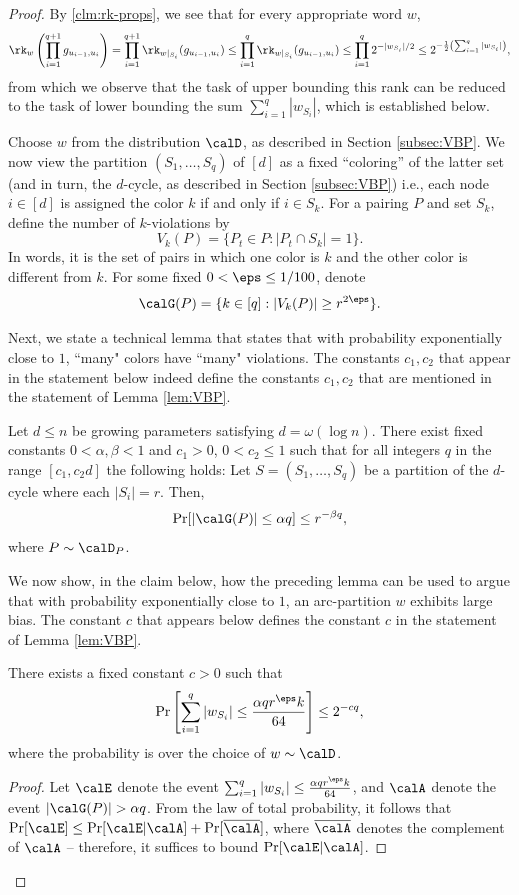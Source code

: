 \documentclass{article}
\begin{document}
\begin{proof}
By \autoref{clm:rk-props}, we see that for every appropriate word $w$,
\[
\rk_w\left(\prod_{i = 1}^{q+1} g_{u_{i-1},u_i}\right) = \prod_{i = 1}^{q+1} \rk_{w|_{S_i}}(g_{u_{i-1},u_i})
\leq \prod_{i = 1}^{q} \rk_{w|_{S_i}}(g_{u_{i-1},u_i})\leq\prod_{i = 1}^q  2^{-|w_{S_i}|/2}\leq 2^{-\frac12\left(\sum_{i=1}^q |w_{S_i}|\right)},
\]
from which we observe that the task of upper bounding this rank can be reduced to the task of lower bounding the sum $\sum_{i=1}^{q}|w_{S_i}|$, which is established below. 

Choose $w$ from the distribution $\calD$, as described in Section \ref{subsec:VBP}. We now view the partition $(S_1,\ldots,S_q)$ of $[d]$ as a fixed ``coloring'' of the latter set (and in turn, the $d$-cycle, as described in Section \ref{subsec:VBP}) i.e., each node $i\in[d]$ is assigned the color $k$ if and only if $i\in S_k$. For a pairing $P$ and set $S_k$, define the number of $k$-violations by
$$
V_k(P) = \{P_t \in P : |P_t \cap S_k| = 1\}.
$$
In words, it is the set of pairs in which one color is $k$ and the other color is different from $k$. For some fixed $0<\eps\leq 1/100$, denote
$$
\calG(P) = \{k \in [q] : |V_k(P)| \geq r^{2\eps}\}.
$$

Next, we state a technical lemma that states that with probability exponentially close to $1$, ``many" colors have ``many" violations. The constants $c_1,c_2$ that appear in the statement below indeed define the constants $c_1,c_2$ that are mentioned in the statement of Lemma \ref{lem:VBP}.
\begin{lem}\label{lem:many-viol} Let $d\leq n$ be growing parameters satisfying $d = \omega(\log n)$. There exist fixed constants 
$0<\alpha,\beta<1$ and $c_1>0$, $0<c_2\leq 1$ such that for all integers $q$ in the range $ [c_1,c_2d] $ the following holds:
Let $S = (S_1, \ldots, S_q)$ be a partition of the $d$-cycle where each $|S_i| = r$.
Then,
$$
\Pr[|\calG(P)| \leq \alpha q] \leq r^{-\beta q},
$$
where $P\sim \calD_P$.
\end{lem}

We now show, in the claim below, how the preceding lemma can be used to argue that with probability exponentially close to $1$, an arc-partition $w$ exhibits large bias. The constant $c$ that appears below defines the constant $c$ in the statement of Lemma \ref{lem:VBP}.

\begin{claim}\label{clm:high-bias-VBP}
There exists a fixed constant $c>0$ such that
\[   \Pr\left[\sum_{i=1}^q |w_{S_i}| \leq \frac{\alpha qr^\eps k}{64}\right] \leq 2^{-cq},
\]
where the probability is over the choice of $w\sim \calD$.
\end{claim}
\begin{proof}
Let $\calE$ denote the event $\sum_{i=1}^q |w_{S_i}| \leq \frac{\alpha qr^\eps k}{64}$, and $\calA$ denote the event $|\calG(P)| > \alpha q$. From the law of total probability, it follows that $\Pr[\calE]\leq \Pr[\calE|\calA] + \Pr[\overline{\calA}]$, where $\overline{\calA}$ denotes the complement of $\calA$ -- therefore, it suffices to bound $\Pr[\calE|\calA]$. 


\end{proof}
\end{proof}
\end{document}

